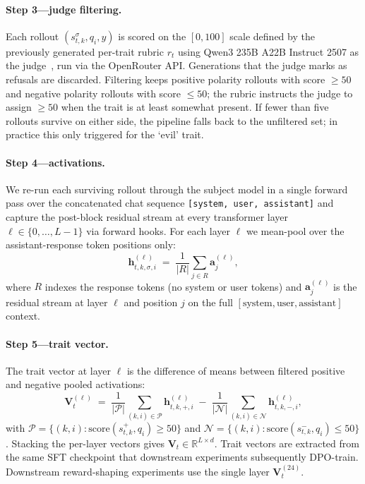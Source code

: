 \documentclass{article} %
\begin{document}
\paragraph{Step 3---judge filtering.}
Each rollout $(s^{\sigma}_{t,k}, q_i, y)$ is scored on the $[0,100]$
scale defined by the previously generated per-trait rubric $r_t$ using
Qwen3 235B A22B Instruct 2507 as the judge~\citep{yang2025qwen3}, run via the
OpenRouter API. Generations that the judge marks as refusals are
discarded. Filtering keeps positive polarity rollouts with score
$\ge 50$ and negative polarity rollouts with score $\le 50$; the
rubric instructs the judge to assign $\ge 50$ when the trait is at
least somewhat present. If fewer than five rollouts survive on either
side, the pipeline falls back to the unfiltered set; in practice this
only triggered for the `evil' trait.

\paragraph{Step 4---activations.}
We re-run each surviving rollout through the subject model in a single
forward pass over the concatenated chat sequence
\texttt{[system, user, assistant]} and capture the post-block residual
stream at every transformer layer $\ell \in \{0,\dots,L{-}1\}$ via
forward hooks. For each layer $\ell$ we mean-pool over the
assistant-response token positions only:
\begin{equation}
\label{eq:trait-mean-pool}
\mathbf{h}^{(\ell)}_{t,k,\sigma,i} \;=\;
\frac{1}{|R|} \sum_{j \in R} \mathbf{a}^{(\ell)}_j,
\end{equation}
where $R$ indexes the response tokens (no system or user tokens) and
$\mathbf{a}^{(\ell)}_j$ is the residual stream at layer $\ell$ and
position $j$ on the full
$[\text{system}, \text{user}, \text{assistant}]$ context.

\paragraph{Step 5---trait vector.}
The trait vector at layer $\ell$ is the difference of means between
filtered positive and negative pooled activations:
\begin{equation}
\label{eq:trait-diff}
\mathbf{V}_t^{(\ell)} \;=\;
\frac{1}{|\mathcal{P}|} \sum_{(k,i)\in\mathcal{P}}
\mathbf{h}^{(\ell)}_{t,k,+,i}
\;-\;
\frac{1}{|\mathcal{N}|} \sum_{(k,i)\in\mathcal{N}}
\mathbf{h}^{(\ell)}_{t,k,-,i},
\end{equation}
with
$\mathcal{P}=\{(k,i) : \text{score}(s^{+}_{t,k}, q_i) \ge 50\}$ and
$\mathcal{N}=\{(k,i) : \text{score}(s^{-}_{t,k}, q_i) \le 50\}$.
Stacking the per-layer vectors gives
$\mathbf{V}_t \in \mathbb{R}^{L \times d}$. Trait vectors are extracted
from the same SFT checkpoint that downstream experiments subsequently
DPO-train. Downstream reward-shaping experiments use the single layer
$\mathbf{V}_t^{(24)}$.
\end{document}
